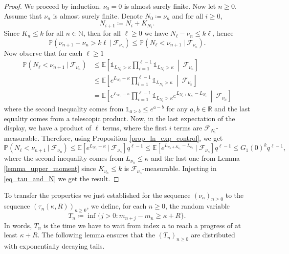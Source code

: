 \documentclass[a4paper, 11pt]{article}
\theoremstyle{plain}
\theoremstyle{definition}
\newcommand{\E}{\mathbb{E}}
\newcommand{\R}{\mathbb{R}}
\newcommand{\N}{\mathbb{N}}
\renewcommand{\P}{\mathbb{P}}
\numberwithin{equation}{section}
\begin{document}
\begin{proof}
    We proceed by induction. $\nu_0=0$ is almost surely finite. Now let $n\geq0$. Assume that $\nu_n$ is almost surely finite. Denote $N_0\coloneqq\nu_n$ and for all $i\geq0$, 
        \[N_{i+1}\coloneqq N_i+K_{N_i}.\]
    Since $K_n\leq k$ for all $n\in\N$, then for all $\ell\geq 0$ we have $N_\ell-\nu_n\leq k\ell$, hence
        \begin{equation}
            \label{eq_tau_and_N}
            \P\left(\nu_{n+1}-\nu_n>k\ell~\vert~\mathcal F_{\nu_n}\right)\leq\P\left(N_\ell<\nu_{n+1}~\vert~\mathcal F_{\nu_n}\right).
        \end{equation}
    Now observe that for each $\ell\geq1$
        \begin{equation}
            \begin{split}
                \P(N_\ell<\nu_{n+1}~\vert~\mathcal F_{\nu_n})&\leq\E\left[\mathds 1_{L_{N_\ell}>\kappa}\prod_{i=1}^{\ell-1}\mathds 1_{L_{N_i}>\kappa}~\middle\vert~\mathcal F_{\nu_n}\right]\\
                &\leq\E\left[e^{L_{N_\ell}-\kappa}\prod_{i=1}^{\ell-1}\mathds 1_{L_{N_i}>\kappa}~\middle\vert~\mathcal F_{\nu_n}\right]\\
                &=\E\left[e^{L_{N_1}-\kappa}\prod_{i=1}^{\ell-1}\mathds 1_{L_{N_i}>\kappa}e^{L_{N_i+K_{N_i}}-L_{N_i}}~\middle\vert~\mathcal F_{\nu_n}\right]
            \end{split}
        \end{equation}
    where the second inequality comes from $\mathds 1_{a>b}\leq e^{a-b}$ for any $a, b\in\R$ and the last equality comes from a telescopic product. Now, in the last expectation of the display, we have a product of $\ell$ terms, where the first $i$ terms are $\mathcal F_{N_i}$-measurable. Therefore, using Proposition \ref{prop_ln_exp_control}, we get
        \begin{equation*}
            \P(N_\ell<\nu_{n+1}~\vert~\mathcal F_{\nu_n})\leq\E[e^{L_{N_1}-\kappa}~\vert~\mathcal F_{\nu_n}]q^{\ell-1}\leq\E[e^{L_{\nu_n+K_{\nu_n}}-L_{\nu_n}}~\vert~\mathcal F_{\nu_n}]q^{\ell-1}\leq G_1(0)^kq^{\ell-1},
        \end{equation*}
    where the second inequality comes from $L_{\nu_n}\leq\kappa$ and the last one from Lemma \ref{lemma_upper_moment} since $K_{\nu_n}\leq k$ is $\mathcal F_{\nu_n}$-measurable. Injecting in \eqref{eq_tau_and_N} we get the result.
\end{proof}


To transfer the properties we just established for the sequence $(\nu_n)_{n\geq 0}$ to the sequence $(\tau_n(\kappa, R))_{n\geq 0}$, we define, for each $n\geq 0$, the random variable
    \[T_n\coloneqq\inf\{j>0:m_{n+j}-m_n\geq\kappa+R\}.\]
In words, $T_n$ is the time we have to wait from index $n$ to reach a progress of at least $\kappa+R$. The following lemma ensures that the $(T_n)_{n\geq 0}$ are distributed with exponentially decaying tails.
\end{document}
